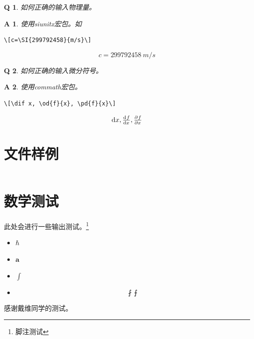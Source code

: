 \documentclass{LZU}
\newcommand{\bvec}[1]{\symbf{#1}}
\newcommand{\package}[1]{{\sffamily #1}}
\newtheorem*{answer}{A}
\newtheorem{question}{Q}
\begin{document}
\begin{question}
    如何正确的输入物理量。
\end{question}
\begin{answer}
    使用\package{siunitx}宏包。如
\begin{verbatim}
\[c=\SI{299792458}{m/s}\]
\end{verbatim}
    \[c=\SI{299792458}{m/s}\]
\end{answer}
\begin{question}
    如何正确的输入微分符号。
\end{question}
\begin{answer}
    使用\package{commath}宏包。
\begin{verbatim}
\[\dif x, \od{f}{x}, \pd{f}{x}\]
\end{verbatim}
    \[\dif x, \od{f}{x}, \pd{f}{x}\]
\end{answer}
\section{文件样例}
\label{sec:bibtex_examples}
\inputminted[breaklines,frame=single,linenos]{bibtex}{example.bib}
\section{数学测试}
此处会进行一些输出测试。\footnote{脚注测试}
\begin{itemize}
    \item $\hbar$
    \item $\bvec{a}$
    \item $\int$
    \item \[\fint\intbar\]
\end{itemize}
\Thanks
感谢戴维同学的测试。
\Grade
\end{document}
